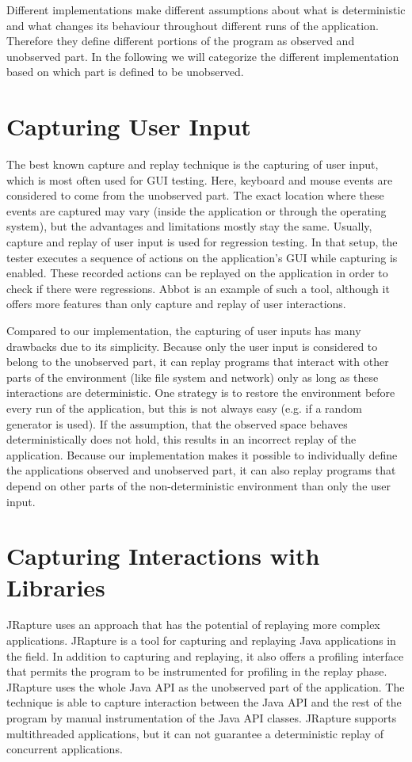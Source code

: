 Different implementations make different assumptions about what is deterministic and what changes its behaviour throughout different runs of the application. Therefore they define different portions of the program as observed and unobserved part. In the following we will categorize the different implementation based on which part is defined to be unobserved.

\section {Capturing User Input}
The best known capture and replay technique is the capturing of user input, which is most often used for GUI testing. Here, keyboard and mouse events are considered to come from the unobserved part. The exact location where these events are captured may vary (inside the application or through the operating system), but the advantages and limitations mostly stay the same. Usually, capture and replay of user input is used for regression testing. In that setup, the tester executes a sequence of actions on the application's GUI while capturing is enabled. These recorded actions can be replayed on the application in order to check if there were regressions. Abbot \cite{abbot} is an example of such a tool, although it offers more features than only capture and replay of user interactions. %

Compared to our implementation, the capturing of user inputs has many drawbacks due to its simplicity. Because only the user input is considered to belong to the unobserved part, it can replay programs that interact with other parts of the environment (like file system and network) only as long as these interactions are deterministic. One strategy is to restore the environment before every run of the application, but this is not always easy (e.g. if a random generator is used). If the assumption, that the observed space behaves deterministically does not hold, this results in an incorrect replay of the application. Because our implementation makes it possible to individually define the applications observed and unobserved part, it can also replay programs that depend on other parts of the non-deterministic environment than only the user input.

\section {Capturing Interactions with Libraries}
JRapture \cite{jrapture} uses an approach that has the potential of replaying more complex applications. JRapture is a tool for capturing and replaying Java applications in the field. In addition to capturing and replaying, it also offers a profiling interface that permits the program to be instrumented for profiling in the replay phase. JRapture uses the whole Java API as the unobserved part of the application. The technique is able to capture interaction between the Java API and the rest of the program by manual instrumentation of the Java API classes. JRapture supports multithreaded applications, but it can not guarantee a deterministic replay of concurrent applications.

